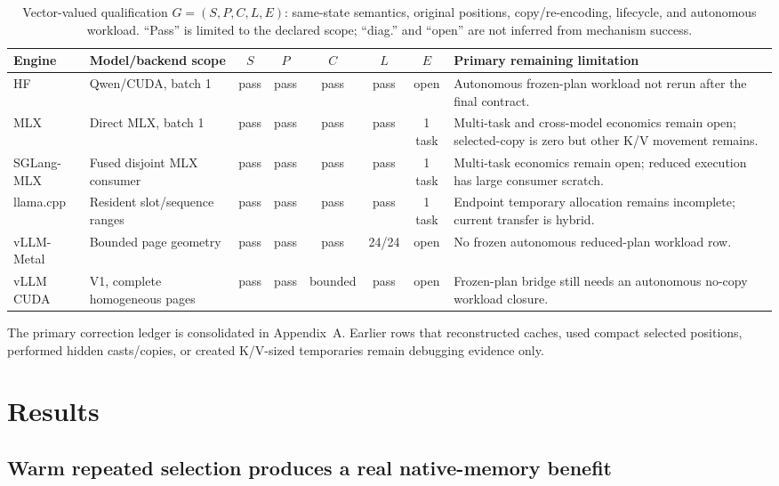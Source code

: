 \documentclass[11pt]{article}
\begin{document}
\begin{table}[H]
\centering
\scriptsize
\setlength{\tabcolsep}{3pt}
\begin{tabularx}{\linewidth}{p{.10\linewidth}p{.19\linewidth}cccccY}
\toprule
Engine & Model/backend scope & $S$ & $P$ & $C$ & $L$ & $E$ & Primary remaining limitation \\
\midrule
HF & Qwen/CUDA, batch 1 & pass & pass & pass & pass & open & Autonomous frozen-plan workload not rerun after the final contract. \\
MLX & Direct MLX, batch 1 & pass & pass & pass & pass & 1 task & Multi-task and cross-model economics remain open; selected-copy is zero but other K/V movement remains. \\
SGLang-MLX & Fused disjoint MLX consumer & pass & pass & pass & pass & 1 task & Multi-task economics remain open; reduced execution has large consumer scratch. \\
llama.cpp & Resident slot/sequence ranges & pass & pass & pass & pass & 1 task & Endpoint temporary allocation remains incomplete; current transfer is hybrid. \\
vLLM-Metal & Bounded page geometry & pass & pass & pass & 24/24 & open & No frozen autonomous reduced-plan workload row. \\
vLLM CUDA & V1, complete homogeneous pages & pass & pass & bounded & pass & open & Frozen-plan bridge still needs an autonomous no-copy workload closure. \\
\bottomrule
\end{tabularx}
\caption{Vector-valued qualification $G=(S,P,C,L,E)$: same-state semantics,
original positions, copy/re-encoding, lifecycle, and autonomous workload.
``Pass'' is limited to the declared scope; ``diag.'' and ``open'' are not
inferred from mechanism success.}
\label{tab:editorial-engine-matrix}
\end{table}

The primary correction ledger is consolidated in Appendix~A.  Earlier rows that
reconstructed caches, used compact selected positions, performed hidden
casts/copies, or created K/V-sized temporaries remain debugging evidence only.

\section{Results}

\subsection{Warm repeated selection produces a real native-memory benefit}
\end{document}
